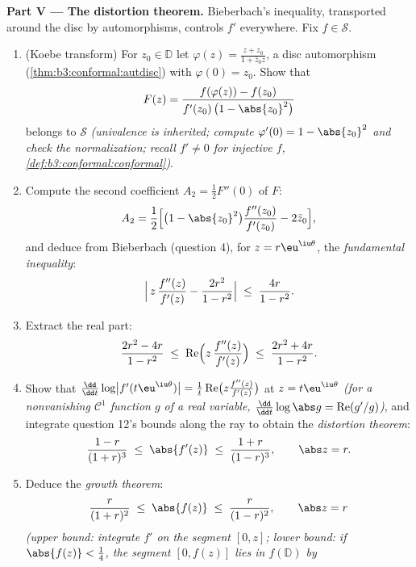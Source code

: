 \begin{problem}
\medskip
\noindent\textbf{Part V --- The distortion theorem.}
Bieberbach's inequality, transported around the disc by
automorphisms, controls $f'$ everywhere. Fix $f \in \mathcal
S$.
\begin{enumerate}[resume]
  \item (Koebe transform) For $z_0 \in \mathbb D$ let
        $\varphi(z) = \frac{z + z_0}{1 + \bar z_0z}$, a disc
        automorphism (\cref{thm:b3:conformal:autdisc}) with
        $\varphi(0) = z_0$. Show that
        \[
        F(z) = \frac{f(\varphi(z)) - f(z_0)}
        {f'(z_0)\,\bigl(1 - \abs{z_0}^2\bigr)}
        \]
        belongs to $\mathcal S$ \emph{(univalence is
        inherited; compute $\varphi'(0) = 1 - \abs{z_0}^2$
        and check the normalization; recall $f' \neq 0$ for
        injective $f$,
        \cref{def:b3:conformal:conformal})}.
  \item Compute the second coefficient $A_2 = \frac12F''(0)$
        of $F$:
        \[
        A_2 = \frac12\Bigl[\bigl(1 - \abs{z_0}^2\bigr)
        \frac{f''(z_0)}{f'(z_0)} - 2\bar z_0\Bigr] ,
        \]
        and deduce from Bieberbach (question 4), for $z =
        r\eu^{\iu\theta}$, the \emph{fundamental
        inequality}:
        \[
        \Bigl|\,z\,\frac{f''(z)}{f'(z)} -
        \frac{2r^2}{1 - r^2}\Bigr|
        \;\leq\; \frac{4r}{1 - r^2} .
        \]
  \item Extract the real part:
        \[
        \frac{2r^2 - 4r}{1 - r^2} \;\leq\;
        \operatorname{Re}\Bigl(z\,\frac{f''(z)}{f'(z)}\Bigr)
        \;\leq\; \frac{2r^2 + 4r}{1 - r^2} .
        \]
  \item Show that $\frac{\dd}{\dd t}\log\bigl|
        f'(t\eu^{\iu\theta})\bigr| = \frac1t
        \operatorname{Re}\bigl(z\frac{f''(z)}{f'(z)}\bigr)$
        at $z = t\eu^{\iu\theta}$ \emph{(for a nonvanishing
        $\mathcal C^1$ function $g$ of a real variable,
        $\frac{\dd}{\dd t}\log\abs g =
        \operatorname{Re}(g'/g)$)}, and integrate question
        12's bounds along the ray to obtain the
        \emph{distortion theorem}:
        \[
        \frac{1 - r}{(1 + r)^3} \;\leq\; \abs{f'(z)}
        \;\leq\; \frac{1 + r}{(1 - r)^3},
        \qquad \abs z = r .
        \]
  \item Deduce the \emph{growth theorem}:
        \[
        \frac{r}{(1 + r)^2} \;\leq\; \abs{f(z)} \;\leq\;
        \frac{r}{(1 - r)^2},
        \qquad \abs z = r
        \]
        \emph{(upper bound: integrate $f'$ on the segment
        $[0, z]$; lower bound: if $\abs{f(z)} < \frac14$,
        the segment $[0, f(z)]$ lies in $f(\mathbb D)$ by
}
\end{enumerate}
\end{problem}
